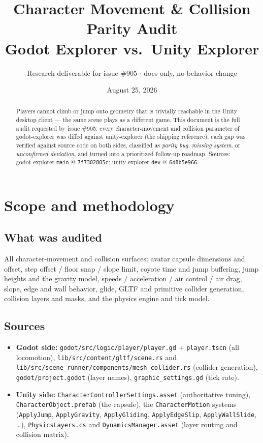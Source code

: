 \documentclass[11pt]{article}
\title{\textbf{Character Movement \& Collision Parity Audit}\\[4pt]
\large Godot Explorer vs.\ Unity Explorer}
\author{Research deliverable for issue \#905 \;\;$\cdot$\;\; docs-only, no behavior change}
\date{August 25, 2026}
\newcommand{\code}[1]{\texttt{\small #1}}
\begin{document}
\sloppy
\maketitle

\begin{abstract}
\noindent Players cannot climb or jump onto geometry that is trivially reachable in the
Unity desktop client --- the same scene plays as a different game. This document is the
full audit requested by issue \#905: every character-movement and collision parameter of
godot-explorer was diffed against unity-explorer (the shipping reference), each gap was
verified against source code on both sides, classified as \emph{parity bug},
\emph{missing system}, or \emph{unconfirmed deviation}, and turned into a prioritized
follow-up roadmap. Sources: godot-explorer \code{main} @ \code{7f7302805c};
unity-explorer \code{dev} @ \code{6d8b5e966}.
\end{abstract}

\tableofcontents
\vspace{1em}

\section{Scope and methodology}

\subsection{What was audited}

All character-movement and collision surfaces: avatar capsule dimensions and offset,
step offset / floor snap / slope limit, coyote time and jump buffering, jump heights and
the gravity model, speeds / acceleration / air control / air drag, slope, edge and wall
behavior, glide, GLTF and primitive collider generation, collision layers and masks, and
the physics engine and tick model.

\subsection{Sources}

\begin{itemize}[leftmargin=1.4em]
  \item \textbf{Godot side:} \code{godot/src/logic/player/player.gd} + \code{player.tscn}
        (all locomotion), \code{lib/src/content/gltf/scene.rs} and
        \code{lib/src/scene\_runner/components/mesh\_collider.rs} (collider generation),
        \code{godot/project.godot} (layer names), \code{graphic\_settings.gd} (tick rate).
  \item \textbf{Unity side:} \code{CharacterControllerSettings.asset} (authoritative tuning),
        \code{CharacterObject.prefab} (the capsule), the \code{CharacterMotion} systems
        (\code{ApplyJump}, \code{ApplyGravity}, \code{ApplyGliding}, \code{ApplyEdgeSlip},
        \code{ApplyWallSlide}, \ldots), \code{PhysicsLayers.cs} and
        \code{DynamicsManager.asset} (layer routing and collision matrix).
\end{itemize}
\end{document}
